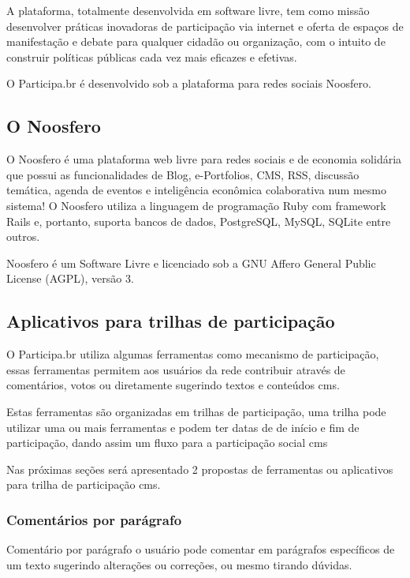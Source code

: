 \documentclass[12pt]{article}
\begin{document}
A plataforma, totalmente desenvolvida em software livre, tem como missão
desenvolver práticas inovadoras de participação via internet e oferta de
espaços de manifestação e debate para qualquer cidadão ou organização, com o
intuito de construir políticas públicas cada vez mais eficazes e efetivas.

O Participa.br é desenvolvido sob a plataforma para redes sociais Noosfero.

\subsection{O Noosfero}

O Noosfero é uma plataforma web livre para redes sociais e de economia
solidária que possui as funcionalidades de Blog, e-Portfolios, CMS, RSS,
discussão temática, agenda de eventos e inteligência econômica colaborativa
num mesmo sistema! O Noosfero utiliza a linguagem de programação Ruby com
framework Rails e, portanto, suporta bancos de dados, PostgreSQL, MySQL,
SQLite entre outros.

Noosfero é um Software Livre e licenciado sob a GNU Affero General Public
License (AGPL), versão 3\cite{wikipediaSingleSignOn}.

\subsection{Aplicativos para trilhas de participação}
 
O Participa.br utiliza algumas ferramentas como mecanismo de participação,
essas ferramentas permitem aos usuários da rede contribuir através de
comentários, votos ou diretamente sugerindo textos e conteúdos \acrlong{cms}.

Estas ferramentas são organizadas em trilhas de participação, uma trilha
pode utilizar uma ou mais ferramentas e podem ter datas de de início e fim de
participação, dando assim um fluxo para a participação social \acrshort{cms}

Nas próximas seções será apresentado 2 propostas de ferramentas ou aplicativos
para trilha de participação \acrfull{cms}.

\subsubsection{Comentários por parágrafo}

Comentário por parágrafo o usuário pode comentar em parágrafos específicos de
um texto sugerindo alterações ou correções, ou mesmo tirando dúvidas.
\end{document}
